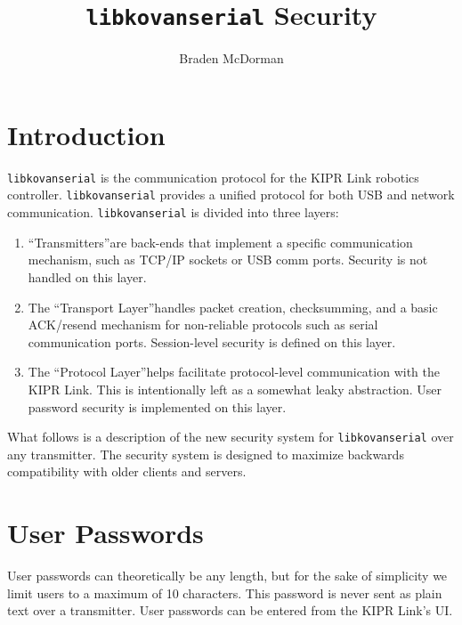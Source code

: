 \documentclass{article}
\newcommand{\lks}[0]{\texttt{libkovanserial} }
\begin{document}
	
	\title{\lks Security}
	\author{Braden McDorman}
	\maketitle
	
	\section{Introduction}
	\lks is the communication protocol for the KIPR Link robotics controller. \lks provides a unified protocol for both USB and network communication. \lks is divided into three layers:
	
	\begin{enumerate}
		\item ``Transmitters''\footnotemark[1] are back-ends that implement a specific communication mechanism, such as TCP/IP sockets or USB comm ports. Security is not handled on this layer.
		\item The ``Transport Layer''\footnotemark[2] handles packet creation, checksumming, and a basic ACK/resend mechanism for non-reliable protocols such as serial communication ports. Session-level security is defined on this layer.
		\item The ``Protocol Layer''\footnotemark[3] helps facilitate protocol-level communication with the KIPR Link. This is intentionally left as a somewhat leaky abstraction. User password security is implemented on this layer.
	\end{enumerate}
	
	
	What follows is a description of the new security system for \lks over any transmitter. The security system is designed
	to maximize backwards compatibility with older clients and servers.
	
	\section{User Passwords}
	User passwords can theoretically be any length, but for the sake of simplicity we limit users to a maximum of 10 characters. This
	password is never sent as plain text over a transmitter. User passwords can be entered from the KIPR Link's UI.
	
\end{document}
